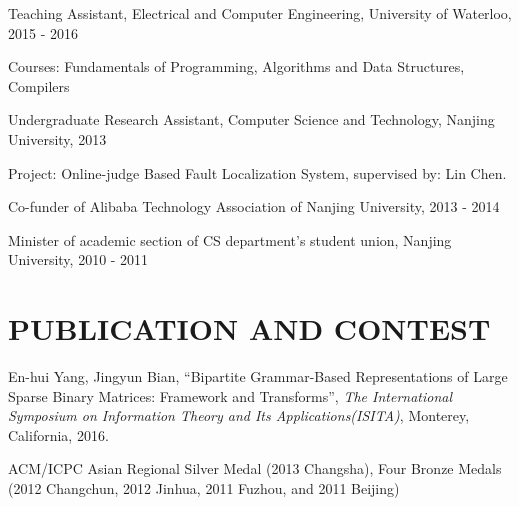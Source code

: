 \documentclass{res}
\newcommand{\parsp}{\vspace{-0.7\baselineskip}}
\newcommand{\additemindent}{\addtolength{\itemindent}{1em}}
\begin{document}
\begin{resume}
\begin{asparaitem}
	\item Teaching Assistant, Electrical and Computer Engineering, University of Waterloo, 2015 - 2016
		\begin{asparaitem}
			\additemindent
			\item Courses: Fundamentals of Programming, Algorithms and Data Structures, Compilers
		\end{asparaitem}

	\item Undergraduate Research Assistant, Computer Science and Technology, Nanjing University, 2013
		\begin{asparaitem}
			\additemindent
			\item Project: Online-judge Based Fault Localization System, supervised by: Lin Chen.
		\end{asparaitem}
	\item Co-funder of Alibaba Technology Association of Nanjing University, 2013 - 2014
	\item Minister of academic section of CS department's student union, Nanjing University, 2010 - 2011	
\end{asparaitem}



\parsp
\section{PUBLICATION AND CONTEST}
	\begin{asparaitem}
		\item En-hui Yang, Jingyun Bian, 
		``Bipartite Grammar-Based Representations of Large Sparse Binary Matrices: Framework and Transforms'', 
		\emph{The International Symposium on Information Theory and Its Applications(ISITA)}, 
		Monterey, California, 
		2016.
		\item ACM/ICPC Asian Regional Silver Medal (2013 Changsha), Four Bronze Medals (2012 Changchun, 2012 Jinhua, 2011 Fuzhou, and 2011 Beijing)
	\end{asparaitem}


\parsp

\end{resume}
\end{document}
